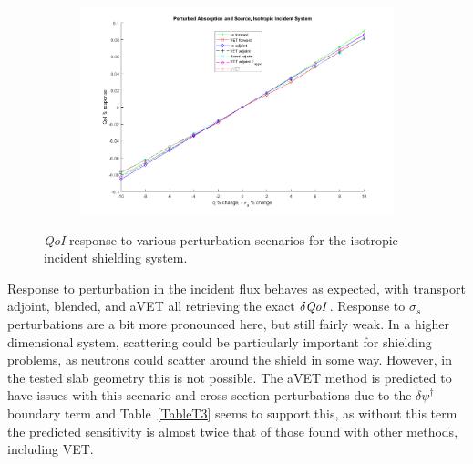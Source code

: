 \documentclass[12pt]{report}
\newcommand{\sigs}{\sigma_s}
\newcommand{\qoi}{{\it QoI}\xspace}
\begin{document}
\begin{figure}[H]
\begin{subfigure}{.5\textwidth}
\end{subfigure}%
\begin{subfigure}{.5\textwidth}
  \centering
  \includegraphics[width=.98\linewidth]{figures2/24incsigaSensNoavet.png}
\end{subfigure}
\caption{\qoi response to various perturbation scenarios for the isotropic incident shielding system.}
\label{fig:Trial3}
\end{figure}

Response to perturbation in the incident flux behaves as expected, with transport adjoint, blended, and aVET all retrieving the exact $\delta \qoi$. Response to $\sigs$ perturbations are a bit more pronounced here, but still fairly weak. In a higher dimensional system, scattering could be particularly important for shielding problems, as neutrons could scatter around the shield in some way. However, in the tested slab geometry this is not possible. The aVET method is predicted to have issues with this scenario and cross-section perturbations due to the $\delta \psi^\dag$ boundary term and Table~\ref{TableT3} seems to support this, as without this term the predicted sensitivity is almost twice that of those found with other methods, including VET.
\end{document}

